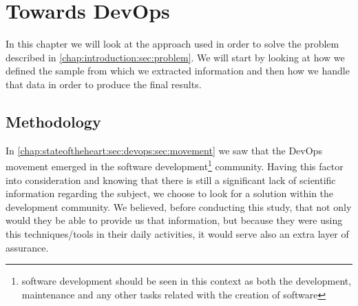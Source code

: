\chapter{Towards DevOps} \label{chap:towardsdevops}
    In this chapter we will look at the approach used in order to solve the problem described in \ref{chap:introduction:sec:problem}. We will start by looking at how we defined the sample from which we extracted information and then how we handle that data in order to produce the final results.

    \section{Methodology} \label{chap:towardsdevops:sec:methodology}
      In \ref{chap:stateoftheheart:sec:devops:sec:movement} we saw that the DevOps movement emerged in the software development\footnote{software development should be seen in this context as both the development, maintenance and any other tasks related with the creation of software} community. Having this factor into consideration and knowing that there is still a significant lack of scientific information regarding the subject, we choose to look for a solution within the development community. We believed, before conducting this study, that not only would they be able to provide us that information, but because they were using this techniques/tools in their daily activities, it would serve also an extra layer of assurance.

